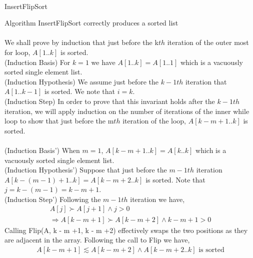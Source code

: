 \documentclass[12pt]{article}
\newenvironment{lemma}[2][Lemma]{\begin{trivlist}
\item[\hskip \labelsep {\bfseries #1}\hskip \labelsep {\bfseries #2.}]}{\end{trivlist}}
\newenvironment{question}[2][Question]{\begin{trivlist}
\item[\hskip \labelsep {\bfseries #1}\hskip \labelsep {\bfseries #2.}]}{\end{trivlist}}
\begin{document}
\begin{question}{1 (b)}
  \leavevmode \\
  \begin{algorithm}
    \caption{InsertFlipSort}
    \BlankLine

  \end{algorithm}
  \begin{lemma}{1.4} Algorithm InsertFlipSort correctly produces a sorted list \\ \\
    We shall prove by induction that just before the k$th$ iteration of the
    outer most for loop, $A[1..k]$ is sorted. \\
    (Induction Basis) For $k = 1$ we have $A[1..k] = A[1..1]$ which is a vacuously
    sorted single element list.\\
    (Induction Hypothesis) We assume just before the $k-1th$ iteration that
    $A[1..k - 1]$ is sorted.  We note that $i = k$. \\
    (Induction Step) In order to prove that this invariant holds after the $k-1th$
    iteration, we will apply induction on the number of iterations of the inner
    while loop to show that just before the m$th$ iteration of the loop,
    $A[k-m+1..k]$ is sorted. \\ \\
    (Induction Basis') When $m = 1$, $A[k-m+1..k] = A[k..k]$ which is a vacuously
    sorted single element list.\\
    (Induction Hypothesis') Suppose that just before the $m-1th$ iteration
    $A[k-(m-1)+1..k] = A[k-m+2..k]$ is sorted.  Note that $j = k - (m - 1) = k - m +1$.\\
    (Induction Step') Following the $m-1th$ iteration we have,
    \begin{align*}
      & A[j] \succ A[j + 1] \land j > 0 &\\
      & \Rightarrow A[k-m+1] \succ A[k-m+2] \land k-m+1 > 0 &
    \end{align*}
    Calling Flip(A, k - m +1, k - m +2) effectively swaps the two positions
    as they are adjacent in the array.  Following the call to Flip we have,
    \begin{align*}
      & A[k-m+1] \lesssim A[k-m+2] \land A[k-m+2..k] \text{ is sorted} & \\

\end{align*}
\end{lemma}
\end{question}
\end{document}

